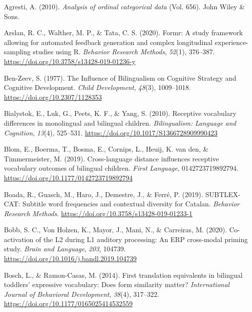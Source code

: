 \documentclass[
  english,
  man,man,floatsintext]{apa6}
\newlength{\cslhangindent}
\newenvironment{cslreferences}%
  {\setlength{\parindent}{0pt}%
  \everypar{\setlength{\hangindent}{\cslhangindent}}\ignorespaces}%
  {\par}
\begin{document}
\begingroup
\setlength{\parindent}{-0.5in}
\setlength{\leftskip}{0.5in}

\hypertarget{refs}{}
\begin{cslreferences}
\leavevmode\hypertarget{ref-agresti_analysis_2010}{}%
Agresti, A. (2010). \emph{Analysis of ordinal categorical data} (Vol. 656). John Wiley \& Sons.

\leavevmode\hypertarget{ref-arslan_formr_2020}{}%
Arslan, R. C., Walther, M. P., \& Tata, C. S. (2020). Formr: A study framework allowing for automated feedback generation and complex longitudinal experience-sampling studies using R. \emph{Behavior Research Methods}, \emph{52}(1), 376--387. \url{https://doi.org/10.3758/s13428-019-01236-y}

\leavevmode\hypertarget{ref-ben-zeev_influence_1977}{}%
Ben-Zeev, S. (1977). The Influence of Bilingualism on Cognitive Strategy and Cognitive Development. \emph{Child Development}, \emph{48}(3), 1009--1018. \url{https://doi.org/10.2307/1128353}

\leavevmode\hypertarget{ref-bialystok_receptive_2010}{}%
Bialystok, E., Luk, G., Peets, K. F., \& Yang, S. (2010). Receptive vocabulary differences in monolingual and bilingual children. \emph{Bilingualism: Language and Cognition}, \emph{13}(4), 525--531. \url{https://doi.org/10.1017/S1366728909990423}

\leavevmode\hypertarget{ref-blom_cross-language_2019}{}%
Blom, E., Boerma, T., Bosma, E., Cornips, L., Heuij, K. van den, \& Timmermeister, M. (2019). Cross-language distance influences receptive vocabulary outcomes of bilingual children. \emph{First Language}, 0142723719892794. \url{https://doi.org/10.1177/0142723719892794}

\leavevmode\hypertarget{ref-boada_subtlex-cat_2019}{}%
Boada, R., Guasch, M., Haro, J., Demestre, J., \& Ferré, P. (2019). SUBTLEX-CAT: Subtitle word frequencies and contextual diversity for Catalan. \emph{Behavior Research Methods}. \url{https://doi.org/10.3758/s13428-019-01233-1}

\leavevmode\hypertarget{ref-bobb_co-activation_2020}{}%
Bobb, S. C., Von Holzen, K., Mayor, J., Mani, N., \& Carreiras, M. (2020). Co-activation of the L2 during L1 auditory processing: An ERP cross-modal priming study. \emph{Brain and Language}, \emph{203}, 104739. \url{https://doi.org/10.1016/j.bandl.2019.104739}

\leavevmode\hypertarget{ref-bosch_first_2014}{}%
Bosch, L., \& Ramon-Casas, M. (2014). First translation equivalents in bilingual toddlers' expressive vocabulary: Does form similarity matter? \emph{International Journal of Behavioral Development}, \emph{38}(4), 317--322. \url{https://doi.org/10.1177/0165025414532559}


\end{cslreferences}
\end{document}
